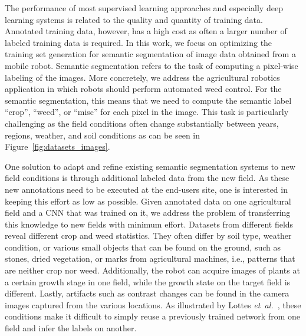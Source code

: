 \documentclass[letterpaper, 10 pt, conference]{ieeeconf}  %
\newcommand\etal{\emph{et~al.}}
\begin{document}
The performance of most supervised learning approaches and especially deep
learning  systems is related to the quality and quantity of training data.
Annotated training data, however, has a high cost as often a larger number of
labeled training data is  required.  In this work, we focus on optimizing the
training set generation for  semantic segmentation of image data obtained
from a mobile robot. Semantic segmentation refers to the task of computing a
pixel-wise  labeling of the images. More concretely, we address the
agricultural robotics  application in which robots should perform automated
weed control. For the semantic  segmentation, this means that we need to
compute the semantic label ``crop'', ``weed'',  or ``misc'' for each pixel in
the image. This task is particularly challenging  as the field conditions
often change substantially between years, regions, weather, and  soil
conditions as can be seen in Figure~\ref{fig:datasets_images}.  

One solution to adapt and refine existing semantic
segmentation systems to new field conditions  is through additional labeled data from the
new field. As these new annotations need to be executed at the end-users site,
one is interested in keeping this effort as low as possible. 
%
Given annotated data on one agricultural field and a CNN that was trained
on it, we address the problem of transferring this knowledge to new fields with
minimum effort.  Datasets from different fields reveal different crop and weed
statistics. They often differ by soil type, weather condition, or
various small objects that can be found  on the ground, such as stones, dried
vegetation, or marks from agricultural machines, i.e., patterns that are
neither crop nor weed. Additionally, the robot can acquire  images of plants
at a certain growth stage in one field, while the growth state on the  target
field is different. Lastly, artifacts such as contrast changes can be found in
the camera images captured from the various locations.  As illustrated by 
Lottes \etal~\cite{lottes2018ral,lottes2017iros}, these conditions make
it difficult to simply reuse a previously trained network from one  field and
infer the labels on another. 
\end{document}
